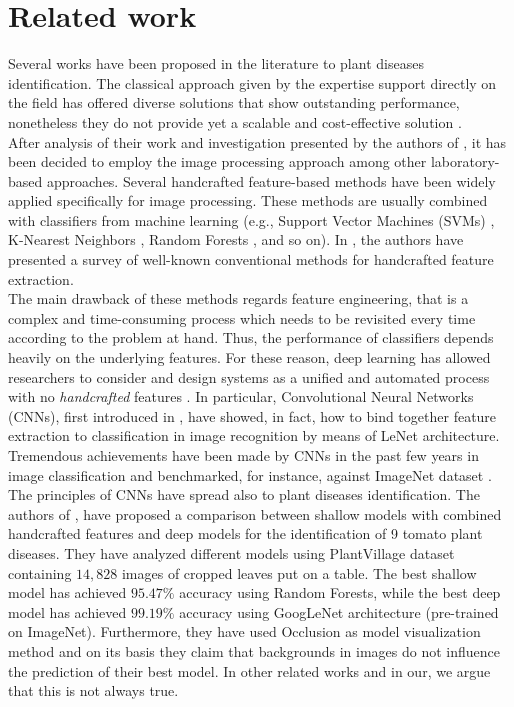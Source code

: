 \section{Related work}
Several works have been proposed in the literature to plant diseases identification. The classical approach given by the expertise support directly on the field has offered diverse solutions that show outstanding performance, nonetheless they do not provide yet a scalable and cost-effective solution \cite{ref17, ref18, ref16}.
\\\indent
After analysis of their work and investigation presented by the authors of \cite{ref15, ref14}, it has been decided to employ the image processing approach among other laboratory-based approaches. Several handcrafted feature-based methods have been widely applied specifically for image processing. These methods are usually combined with classifiers from machine learning (e.g., Support Vector Machines (SVMs) \cite{ref24}, K-Nearest Neighbors \cite{ref25}, Random Forests \cite{ref26}, and so on). In \cite{ref27}, the authors have presented a survey of well-known conventional methods for handcrafted feature extraction.
\\\indent
The main drawback of these methods regards feature engineering, that is a complex and time-consuming process which needs to be revisited every time according to the problem at hand. Thus, the performance of classifiers depends heavily on the underlying features. For these reason, deep learning has allowed researchers to consider and design systems as a unified and automated process with no \emph{handcrafted} features \cite{ref29}. In particular, Convolutional Neural Networks (CNNs), first introduced in \cite{ref30}, have showed, in fact, how to bind together feature extraction to classification in image recognition by means of LeNet architecture. Tremendous achievements have been made by CNNs in the past few years in image classification and benchmarked, for instance, against ImageNet dataset \cite{ref28}.
\\\indent
The principles of CNNs have spread also to plant diseases identification. The authors of \cite{ref11}, have proposed a comparison between shallow models with combined handcrafted features and deep models for the identification of 9 tomato plant diseases. They have analyzed different models using PlantVillage dataset containing $14,828$ images of cropped leaves put on a table. The best shallow model has achieved $95.47\%$ accuracy using Random Forests, while the best deep model has achieved $99.19\%$ accuracy using GoogLeNet architecture (pre-trained on ImageNet). Furthermore, they have used Occlusion \cite{ref13} as model visualization method and on its basis they claim that backgrounds in images do not influence the prediction of their best model. In other related works \cite{ref33, ref10} and in our, we argue that this is not always true.
